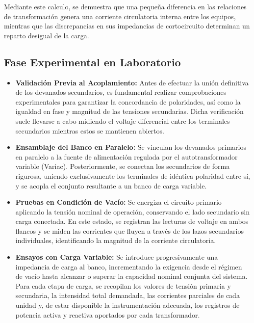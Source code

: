 Mediante este calculo, se demuestra que una pequeña diferencia en las relaciones de transformación genera una corriente circulatoria interna entre los equipos, mientras que las discrepancias en sus impedancias de cortocircuito determinan un reparto desigual de la carga.

\subsection{Fase Experimental en Laboratorio}



\begin{itemize}
    \item\textbf{Validación Previa al Acoplamiento:} Antes de efectuar la unión definitiva de los devanados secundarios, es fundamental realizar comprobaciones experimentales para garantizar la concordancia de polaridades, así como la igualdad en fase y magnitud de las tensiones secundarias. Dicha verificación suele llevarse a cabo midiendo el voltaje diferencial entre los terminales secundarios mientras estos se mantienen abiertos.
    
    \item\textbf{Ensamblaje del Banco en Paralelo:} Se vinculan los devanados primarios en paralelo a la fuente de alimentación regulada por el autotransformador variable (Variac). Posteriormente, se conectan los secundarios de forma rigurosa, uniendo exclusivamente los terminales de idéntica polaridad entre sí, y se acopla el conjunto resultante a un banco de carga variable.
    
    \item \textbf{Pruebas en Condición de Vacío:} Se energiza el circuito primario aplicando la tensión nominal de operación, conservando el lado secundario sin carga conectada. En este estado, se registran las lecturas de voltaje en ambos flancos y se miden las corrientes que fluyen a través de los lazos secundarios individuales, identificando la magnitud de la corriente circulatoria.
    
    \item \textbf{Ensayos con Carga Variable:} Se introduce progresivamente una impedancia de carga al banco, incrementando la exigencia desde el régimen de vacío hasta alcanzar o superar la capacidad nominal conjunta del sistema. Para cada etapa de carga, se recopilan los valores de tensión primaria y secundaria, la intensidad total demandada, las corrientes parciales de cada unidad y, de estar disponible la instrumentación adecuada, los registros de potencia activa y reactiva aportados por cada transformador.
\end{itemize}